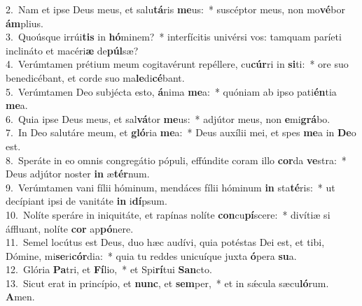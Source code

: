 {2.~}Nam et ipse Deus meus, et salu\textbf{tá}ris \textbf{me}us:~* suscéptor meus, non mo\textbf{vé}bor \textbf{ám}plius.\\
{3.~}Quoúsque irrúi\textbf{tis} in \textbf{hó}minem?~* interfícitis univérsi vos: tamquam paríeti inclináto et macéri\textbf{æ} de\textbf{púl}sæ?\\
{4.~}Verúmtamen prétium meum cogitavérunt repéllere, cu\textbf{cúr}ri in \textbf{si}ti:~* ore suo benedicébant, et corde suo ma\textbf{le}di\textbf{cé}bant.\\
{5.~}Verúmtamen Deo subjécta esto, \textbf{á}nima \textbf{me}a:~* quóniam ab ipso pati\textbf{én}tia \textbf{me}a.\\
{6.~}Quia ipse Deus meus, et sal\textbf{vá}tor \textbf{me}us:~* adjútor meus, non \textbf{e}mi\textbf{grá}bo.\\
{7.~}In Deo salutáre meum, et \textbf{gló}ria \textbf{me}a:~* Deus auxílii mei, et spes \textbf{me}a in \textbf{De}o est.\\
{8.~}Speráte in eo omnis congregátio pópuli, effúndite coram illo \textbf{cor}da \textbf{ve}stra:~* Deus adjútor noster \textbf{in} æ\textbf{tér}num.\\
{9.~}Verúmtamen vani fílii hóminum, mendáces fílii hóminum \textbf{in} sta\textbf{té}ris:~* ut decípiant ipsi de vanitáte \textbf{in} i\textbf{dí}psum.\\
{10.~}Nolíte speráre in iniquitáte, et rapínas nolíte \textbf{con}cu\textbf{pí}scere:~* divítiæ si áffluant, nolíte \textbf{cor} ap\textbf{pó}nere.\\
{11.~}Semel locútus est Deus, duo hæc audívi, quia potéstas Dei est, et tibi, Dómine, mi\textbf{se}ri\textbf{cór}dia:~* quia tu reddes unicuíque juxta \textbf{ó}pera \textbf{su}a.\\
{12.~}Glória \textbf{Pa}tri, et \textbf{Fí}lio,~* et Spi\textbf{rí}tui \textbf{San}cto.\\
{13.~}Sicut erat in princípio, et \textbf{nunc}, et \textbf{sem}per,~* et in sǽcula sæcu\textbf{ló}rum. \textbf{A}men.\\
